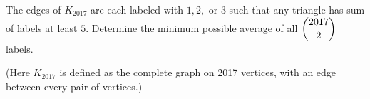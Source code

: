 The edges of $K_{2017}$ are each labeled with $1,2,$ or $3$ such that any triangle has sum of labels at least $5.$ Determine the minimum possible average of all $\dbinom{2017}{2}$ labels.

(Here $K_{2017}$ is defined as the complete graph on 2017 vertices, with an edge between every pair of vertices.)

